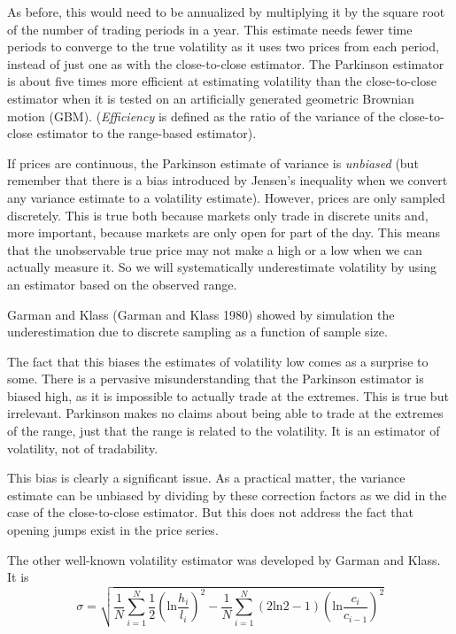 \documentclass[11pt]{report}
\begin{document}
		As before, this would need to be annualized by multiplying it by the square root of the number of trading periods in a year. This estimate needs fewer time periods to converge to the true volatility as it uses two prices from each period, instead of just one as with the close-to-close estimator. The Parkinson estimator is about five times more efficient at estimating volatility than the close-to-close estimator when it is tested on an artificially generated geometric Brownian motion (GBM). (\textit{Efficiency} is defined as the ratio of the variance of the close-to-close estimator to the range-based estimator).
		
		If prices are continuous, the Parkinson estimate of variance is \textit{unbiased} (but remember that there is a bias introduced by Jensen's inequality when we convert any variance estimate to a volatility estimate). However, prices are only sampled discretely. This is true both because markets only trade in discrete units and, more important, because markets are only open for part of the day. This means that the unobservable true price may not make a high or a low when we can actually measure it. So we will systematically underestimate volatility by using an estimator based on the observed range.
		
		Garman and Klass (Garman and Klass 1980) showed by simulation the underestimation due to discrete sampling as a function of sample size.
		
		The fact that this biases the estimates of volatility low comes as a surprise to some. There is a pervasive misunderstanding that the Parkinson estimator is biased high, as it is impossible to actually trade at the extremes. This is true but irrelevant. Parkinson makes no claims about being able to trade at the extremes of the range, just that the range is related to the volatility. It is an estimator of volatility, not of tradability.
		
		This bias is clearly a significant issue. As a practical matter, the variance estimate can be unbiased by dividing by these correction factors as we did in the case of the close-to-close estimator. But this does not address the fact that opening jumps exist in the price series.

		The other well-known volatility estimator was developed by Garman and Klass. It is
		\begin{equation}
			\sigma = \sqrt{\frac{1}{N} \sum_{i=1}^N \frac{1}{2} \left(\text{ln}\frac{h_i}{l_i}\right)^2 - \frac{1}{N} \sum_{i=1}^N (2\text{ln}2 - 1) \left(\text{ln}\frac{c_i}{c_{i-1}}\right)^2}
		\end{equation}
\end{document}
